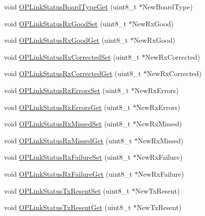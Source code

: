 \begin{DoxyCompactItemize}
\item 
void \hyperlink{group___o_p_link_status_gadd2ac01cacfac4be12350cf4777371b2}{\-O\-P\-Link\-Status\-Board\-Type\-Get} (uint8\-\_\-t $\ast$\-New\-Board\-Type)
\item 
void \hyperlink{group___o_p_link_status_ga74cad0d61f33487220654b8d3ef43eb6}{\-O\-P\-Link\-Status\-Rx\-Good\-Set} (uint8\-\_\-t $\ast$\-New\-Rx\-Good)
\item 
void \hyperlink{group___o_p_link_status_ga60338429749fed0431853b2c202baf37}{\-O\-P\-Link\-Status\-Rx\-Good\-Get} (uint8\-\_\-t $\ast$\-New\-Rx\-Good)
\item 
void \hyperlink{group___o_p_link_status_ga505d492567e1578add6d57b3b9090a4f}{\-O\-P\-Link\-Status\-Rx\-Corrected\-Set} (uint8\-\_\-t $\ast$\-New\-Rx\-Corrected)
\item 
void \hyperlink{group___o_p_link_status_gae04163b4dada821effd84f87349302b8}{\-O\-P\-Link\-Status\-Rx\-Corrected\-Get} (uint8\-\_\-t $\ast$\-New\-Rx\-Corrected)
\item 
void \hyperlink{group___o_p_link_status_ga457965a980855084ce60e63588daa1d6}{\-O\-P\-Link\-Status\-Rx\-Errors\-Set} (uint8\-\_\-t $\ast$\-New\-Rx\-Errors)
\item 
void \hyperlink{group___o_p_link_status_ga8557c818a119de8049570e28f31786c7}{\-O\-P\-Link\-Status\-Rx\-Errors\-Get} (uint8\-\_\-t $\ast$\-New\-Rx\-Errors)
\item 
void \hyperlink{group___o_p_link_status_ga743e5c01f3eb996fc73abc3c3a9d1970}{\-O\-P\-Link\-Status\-Rx\-Missed\-Set} (uint8\-\_\-t $\ast$\-New\-Rx\-Missed)
\item 
void \hyperlink{group___o_p_link_status_ga1aa8cb4e744c5446b2e81deca78f46aa}{\-O\-P\-Link\-Status\-Rx\-Missed\-Get} (uint8\-\_\-t $\ast$\-New\-Rx\-Missed)
\item 
void \hyperlink{group___o_p_link_status_gafda11b0cdd62ce808580543c675df018}{\-O\-P\-Link\-Status\-Rx\-Failure\-Set} (uint8\-\_\-t $\ast$\-New\-Rx\-Failure)
\item 
void \hyperlink{group___o_p_link_status_ga2bdcd9f0d8eb8c09e3032d153a0205ed}{\-O\-P\-Link\-Status\-Rx\-Failure\-Get} (uint8\-\_\-t $\ast$\-New\-Rx\-Failure)
\item 
void \hyperlink{group___o_p_link_status_ga540b3d3008e0483a801485a1aed62d69}{\-O\-P\-Link\-Status\-Tx\-Resent\-Set} (uint8\-\_\-t $\ast$\-New\-Tx\-Resent)
\item 
void \hyperlink{group___o_p_link_status_gabcaca261f67bb90400a72a46f92bf426}{\-O\-P\-Link\-Status\-Tx\-Resent\-Get} (uint8\-\_\-t $\ast$\-New\-Tx\-Resent)

\end{DoxyCompactItemize}
